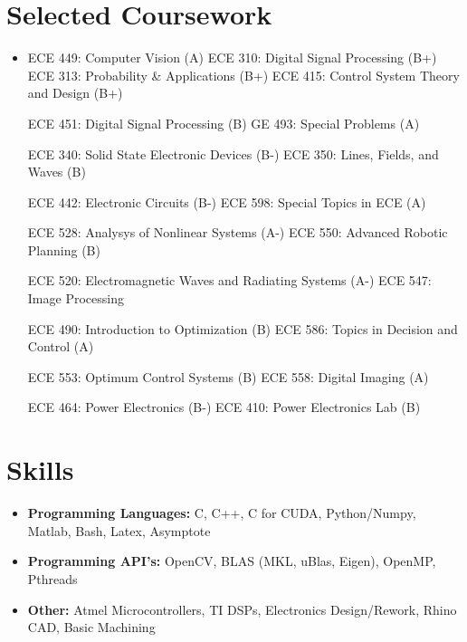\documentclass[line]{res}
\def\uiuc{University of Illinois at Urbana-Champaign}
\def\spaceline{\vspace{1mm} \fullline}
\begin{document}
\begin{resume}
\begin{itemize}
\end{itemize}




	\vspace{-3mm}
	\section{Selected Coursework}
	\begin{itemize}
	\item 
	\spaceline
ECE 449: Computer Vision (A)	
ECE 310: Digital Signal Processing (B+)
ECE 313: Probability \& Applications (B+)
ECE 415: Control System Theory and Design (B+)

ECE 451: Digital Signal Processing (B)
GE 493: Special Problems (A)

ECE 340: Solid State Electronic Devices (B-)
ECE 350: Lines, Fields, and Waves (B)

ECE 442: Electronic Circuits (B-)
ECE 598: Special Topics in ECE (A)

ECE 528: Analysys of Nonlinear Systems (A-)
ECE 550: Advanced Robotic Planning (B)

ECE 520: Electromagnetic Waves and Radiating Systems (A-)
ECE 547: Image Processing

ECE 490: Introduction to Optimization (B)
ECE 586: Topics in Decision and Control (A)

ECE 553: Optimum Control Systems (B)
ECE 558: Digital Imaging (A)

ECE 464: Power Electronics (B-)
ECE 410: Power Electronics Lab (B)


	\end{itemize}

	\vspace{-3mm}
	\section{Skills}
	\begin{itemize}
	\item 
	\spaceline
{\bf Programming Languages: } C, C++, C for CUDA, Python/Numpy, Matlab, Bash, Latex, Asymptote
\item {\bf Programming API's: } OpenCV, BLAS (MKL, uBlas, Eigen), OpenMP, Pthreads
\item {\bf Other: } Atmel Microcontrollers, TI DSPs, Electronics Design/Rework, Rhino CAD, Basic Machining
\end{itemize}

		\end{resume}
		
\end{document}
